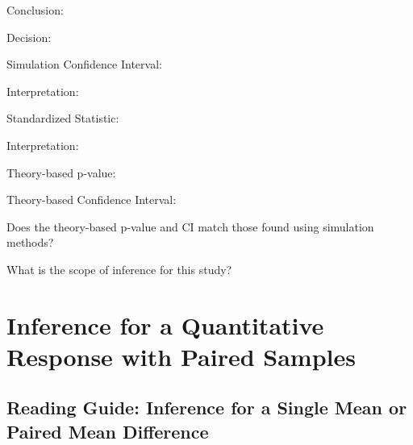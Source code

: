 \documentclass[
]{report}
\newcommand{\rgi}{\hspace{24pt}}  %
\begin{document}
\vspace{0.8in}

\rgi \rgi Conclusion:

\vspace{0.8in}

\rgi \rgi Decision:

\vspace{0.3in}

\rgi Simulation Confidence Interval:

\vspace{0.3in}

\rgi \rgi Interpretation:

\vspace{0.8in}

\rgi Standardized Statistic:

\vspace{0.3in}

\rgi \rgi Interpretation:

\vspace{0.8in}

\rgi Theory-based p-value:

\vspace{0.3in}

\rgi Theory-based Confidence Interval:

\vspace{0.5in}

\rgi Does the theory-based p-value and CI match those found using simulation methods?

\vspace{0.8in}

\rgi What is the scope of inference for this study?

\vspace{0.8in}

\newpage

\hypertarget{inference-for-a-quantitative-response-with-paired-samples}{%
\chapter{Inference for a Quantitative Response with Paired Samples}\label{inference-for-a-quantitative-response-with-paired-samples}}

\hypertarget{reading-guide-inference-for-a-single-mean-or-paired-mean-difference}{%
\section{Reading Guide: Inference for a Single Mean or Paired Mean Difference}\label{reading-guide-inference-for-a-single-mean-or-paired-mean-difference}}
\end{document}
